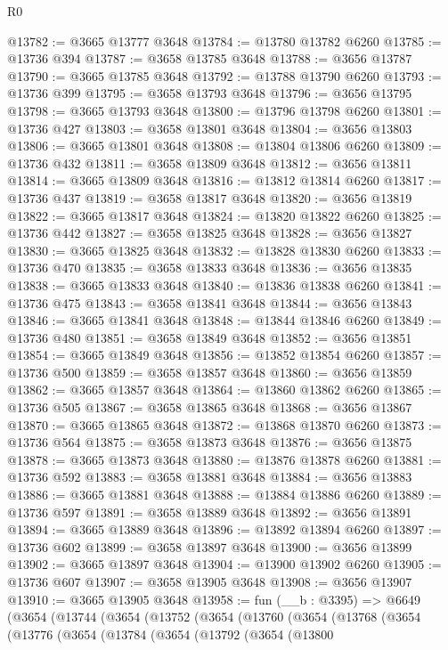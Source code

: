 \begin{lexlean}{R0}
\begin{coremodule}
@13782 := @3665 @13777 @3648
@13784 := @13780 @13782 @6260
@13785 := @13736 @394
@13787 := @3658 @13785 @3648
@13788 := @3656 @13787
@13790 := @3665 @13785 @3648
@13792 := @13788 @13790 @6260
@13793 := @13736 @399
@13795 := @3658 @13793 @3648
@13796 := @3656 @13795
@13798 := @3665 @13793 @3648
@13800 := @13796 @13798 @6260
@13801 := @13736 @427
@13803 := @3658 @13801 @3648
@13804 := @3656 @13803
@13806 := @3665 @13801 @3648
@13808 := @13804 @13806 @6260
@13809 := @13736 @432
@13811 := @3658 @13809 @3648
@13812 := @3656 @13811
@13814 := @3665 @13809 @3648
@13816 := @13812 @13814 @6260
@13817 := @13736 @437
@13819 := @3658 @13817 @3648
@13820 := @3656 @13819
@13822 := @3665 @13817 @3648
@13824 := @13820 @13822 @6260
@13825 := @13736 @442
@13827 := @3658 @13825 @3648
@13828 := @3656 @13827
@13830 := @3665 @13825 @3648
@13832 := @13828 @13830 @6260
@13833 := @13736 @470
@13835 := @3658 @13833 @3648
@13836 := @3656 @13835
@13838 := @3665 @13833 @3648
@13840 := @13836 @13838 @6260
@13841 := @13736 @475
@13843 := @3658 @13841 @3648
@13844 := @3656 @13843
@13846 := @3665 @13841 @3648
@13848 := @13844 @13846 @6260
@13849 := @13736 @480
@13851 := @3658 @13849 @3648
@13852 := @3656 @13851
@13854 := @3665 @13849 @3648
@13856 := @13852 @13854 @6260
@13857 := @13736 @500
@13859 := @3658 @13857 @3648
@13860 := @3656 @13859
@13862 := @3665 @13857 @3648
@13864 := @13860 @13862 @6260
@13865 := @13736 @505
@13867 := @3658 @13865 @3648
@13868 := @3656 @13867
@13870 := @3665 @13865 @3648
@13872 := @13868 @13870 @6260
@13873 := @13736 @564
@13875 := @3658 @13873 @3648
@13876 := @3656 @13875
@13878 := @3665 @13873 @3648
@13880 := @13876 @13878 @6260
@13881 := @13736 @592
@13883 := @3658 @13881 @3648
@13884 := @3656 @13883
@13886 := @3665 @13881 @3648
@13888 := @13884 @13886 @6260
@13889 := @13736 @597
@13891 := @3658 @13889 @3648
@13892 := @3656 @13891
@13894 := @3665 @13889 @3648
@13896 := @13892 @13894 @6260
@13897 := @13736 @602
@13899 := @3658 @13897 @3648
@13900 := @3656 @13899
@13902 := @3665 @13897 @3648
@13904 := @13900 @13902 @6260
@13905 := @13736 @607
@13907 := @3658 @13905 @3648
@13908 := @3656 @13907
@13910 := @3665 @13905 @3648
@13958 := fun (__b : @3395) =>
  @6649
    (@3654
      (@13744
        (@3654
          (@13752
            (@3654
              (@13760
                (@3654
                  (@13768
                    (@3654
                      (@13776
                        (@3654
                          (@13784
                            (@3654
                              (@13792
                                (@3654
                                  (@13800

\end{coremodule}
\end{lexlean}

